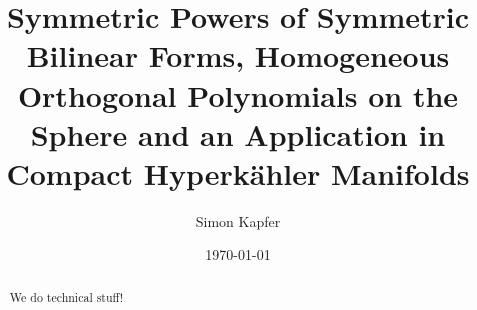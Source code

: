 \documentclass{amsart}
\theoremstyle{plain}
\theoremstyle{definition}
\theoremstyle{remark}
\begin{document}
\title[Symmetric Powers, Hom.~Orth.~Polynomials, Hyperk\"ahlers]{Symmetric Powers of Symmetric Bilinear Forms, Homogeneous Orthogonal Polynomials on the Sphere and an Application in Compact Hyperk\"ahler Manifolds}


\author{Simon Kapfer}
\address{Simon Kapfer, Laboratoire de Math\'ematiques et Applications, UMR CNRS 6086, Universit\'e de Poitiers, T\'el\'eport 2, Boulevard Marie et Pierre Curie, F-86962 Futuroscope Chasseneuil}


\date{\today}


\begin{abstract} 
We do technical stuff!
\end{abstract}

\maketitle

\end{document}
